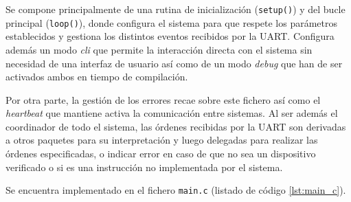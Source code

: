 \begin{itemize}
    Se compone principalmente de una rutina de inicialización (\texttt{setup()})
    y del bucle principal (\texttt{loop()}), donde configura el sistema para que
    respete los parámetros establecidos y gestiona los distintos eventos recibidos
    por la \ac{UART}. Configura además un modo \textit{cli} que permite la interacción
    directa con el sistema sin necesidad de una interfaz de usuario así como de un
    modo \textit{debug} que han de ser activados ambos en tiempo de compilación.

    Por otra parte, la gestión de los errores recae sobre este fichero así como
    el \textit{heartbeat} que mantiene activa la comunicación entre sistemas. Al ser
    además el coordinador de todo el sistema, las órdenes recibidas por la \ac{UART}
    son derivadas a otros paquetes para su interpretación y luego delegadas para
    realizar las órdenes especificadas, o indicar error en caso de que no sea un
    dispositivo verificado o si es una instrucción no implementada por el sistema.

    Se encuentra implementado en el fichero \texttt{main.c} (listado de código
    \ref{lst:main_c}).
\end{itemize}